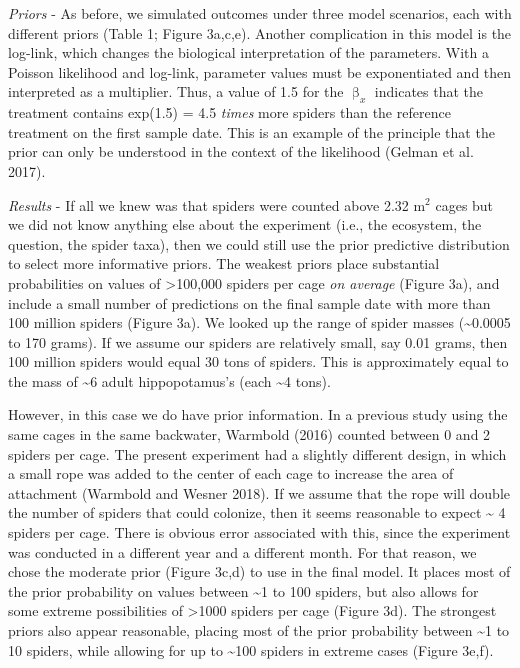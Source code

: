 \documentclass[
  12pt,
]{article}
\begin{document}
\emph{Priors} - As before, we simulated outcomes under three model
scenarios, each with different priors (Table 1; Figure 3a,c,e). Another
complication in this model is the log-link, which changes the biological
interpretation of the parameters. With a Poisson likelihood and
log-link, parameter values must be exponentiated and then interpreted as
a multiplier. Thus, a value of 1.5 for the \(\upbeta_x\) indicates that
the treatment contains exp(1.5) = 4.5 \emph{times} more spiders than the
reference treatment on the first sample date. This is an example of the
principle that the prior can only be understood in the context of the
likelihood (Gelman et al. 2017).

\emph{Results} - If all we knew was that spiders were counted above 2.32
m\(^2\) cages but we did not know anything else about the experiment
(i.e., the ecosystem, the question, the spider taxa), then we could
still use the prior predictive distribution to select more informative
priors. The weakest priors place substantial probabilities on values of
\textgreater100,000 spiders per cage \emph{on average} (Figure 3a), and
include a small number of predictions on the final sample date with more
than 100 million spiders (Figure 3a). We looked up the range of spider
masses (\textasciitilde0.0005 to 170 grams). If we assume our spiders
are relatively small, say 0.01 grams, then 100 million spiders would
equal 30 tons of spiders. This is approximately equal to the mass of
\textasciitilde6 adult hippopotamus's (each \textasciitilde4 tons).

However, in this case we do have prior information. In a previous study
using the same cages in the same backwater, Warmbold (2016) counted
between 0 and 2 spiders per cage. The present experiment had a slightly
different design, in which a small rope was added to the center of each
cage to increase the area of attachment (Warmbold and Wesner 2018). If
we assume that the rope will double the number of spiders that could
colonize, then it seems reasonable to expect \textasciitilde{} 4 spiders
per cage. There is obvious error associated with this, since the
experiment was conducted in a different year and a different month. For
that reason, we chose the moderate prior (Figure 3c,d) to use in the
final model. It places most of the prior probability on values between
\textasciitilde1 to 100 spiders, but also allows for some extreme
possibilities of \textgreater1000 spiders per cage (Figure 3d). The
strongest priors also appear reasonable, placing most of the prior
probability between \textasciitilde1 to 10 spiders, while allowing for
up to \textasciitilde100 spiders in extreme cases (Figure 3e,f).
\end{document}
